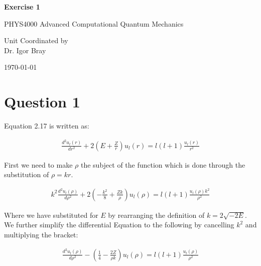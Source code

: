 \documentclass{article}
\begin{document}
\newpage
\begin{center}
       
       \vspace*{1cm}
        \LARGE
       \textbf{Exercise 1}

       \vspace{0.5cm}
        PHYS4000
        Advanced Computational Quantum Mechanics
            
       \vspace{1.5cm}

       \bigskip

       Unit Coordinated by\\
       Dr. Igor Bray
            
       \vspace{0.8cm}
     
            
       
        \today
            
\end{center}
\newpage



\section{Question 1}

Equation 2.17 is written as:

    \begin{gather}
        \frac{d^2u_l(r)}{dr^2} + 2(E+\frac{Z}{r}) u_l(r) = l(l+1)\frac{u_l(r)}{r^2}
    \end{gather}

    First we need to make $\rho$ the subject of the function which is done through the substitution of
    $\rho=kr$.

    \begin{gather}
        k^2 \frac{d^2u_l(\rho)}{d\rho^2} + 2(-\frac{k^2}{8}+\frac{Zk}{\rho})u_l(\rho) =  l(l+1)\frac{u_l(\rho)k^2}{\rho^2}
    \end{gather}

    Where we have substituted for $E$ by rearranging the definition of $k=2\sqrt{-2E}$. 
    We further simplify the differential Equation to the following by cancelling $k^2$ and multiplying the bracket:

    \begin{gather}
        \frac{d^2u_l(\rho)}{d\rho^2} - (\frac{1}{4}-\frac{2Z}{\rho k})u_l(\rho) =  l(l+1)\frac{u_l(\rho)}{\rho^2}
    \end{gather}
\end{document}
